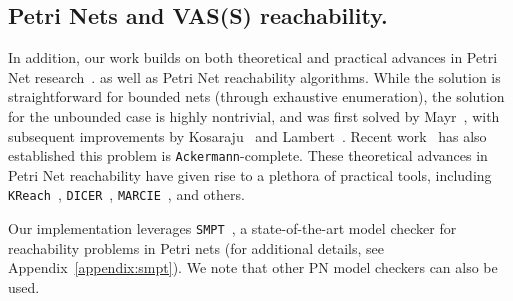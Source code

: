 \subsection{Petri Nets and VAS(S) reachability.}
\label{sec:related:petri}

In addition, our work builds on both theoretical and practical advances in 
Petri Net research~\cite{Mu89, Es96, Re12, EsNi24}. 
%
as well as Petri Net reachability algorithms. While the solution is 
straightforward for bounded nets (through exhaustive enumeration), the solution 
for the unbounded case is highly nontrivial, and was first solved by 
Mayr~\cite{Ma81}, with subsequent improvements by Kosaraju~\cite{Ko82} and 
Lambert~\cite{La92}. Recent work~\cite{CzWo22} has also established this 
problem is \texttt{Ackermann}-complete.
%
These theoretical advances in Petri Net reachability have given rise to a 
plethora of practical tools, including \texttt{KReach}~\cite{DiLa20}, 
\texttt{DICER}~\cite{XiZhLi21}, \texttt{MARCIE}~\cite{HeRoSc13}, and others. 

Our implementation leverages \texttt{SMPT}~\cite{AmDa23}, a state-of-the-art model checker for reachability problems in Petri nets (for additional details, see Appendix~\ref{appendix:smpt}). We note that other PN model checkers can also be used.





